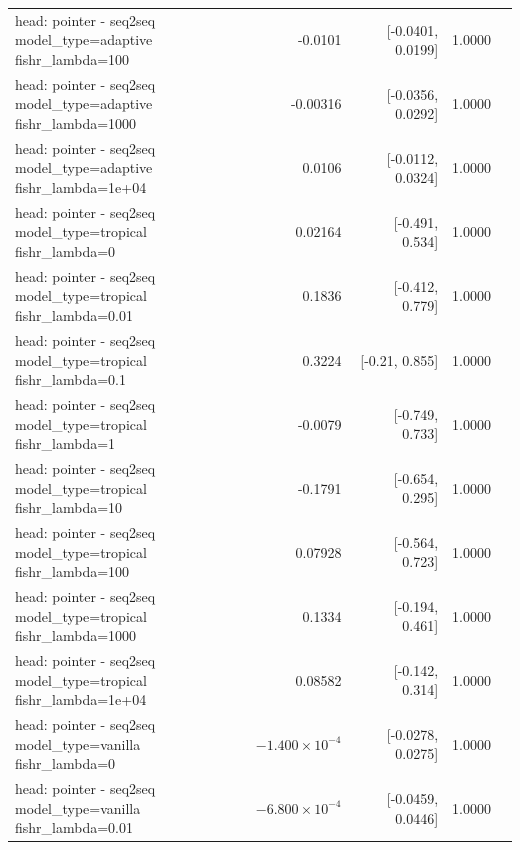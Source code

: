 \documentclass[10pt]{article}
\makeatletter
\newcommand{\stackcell}[1]{\begin{tabular}[t]{@{}l@{}}#1\end{tabular}}
\makeatother
\begin{document}
{\begin{longtable}{lrrrl}
\stackcell{head: pointer - seq2seq\\\footnotesize model\_type=adaptive fishr\_lambda=100 } & -0.0101 & [-0.0401, 0.0199] & 1.0000 & \\
\stackcell{head: pointer - seq2seq\\\footnotesize model\_type=adaptive fishr\_lambda=1000 } & -0.00316 & [-0.0356, 0.0292] & 1.0000 & \\
\stackcell{head: pointer - seq2seq\\\footnotesize model\_type=adaptive fishr\_lambda=1e+04 } & 0.0106 & [-0.0112, 0.0324] & 1.0000 & \\
\stackcell{head: pointer - seq2seq\\\footnotesize model\_type=tropical fishr\_lambda=0 } & 0.02164 & [-0.491, 0.534] & 1.0000 & \\
\stackcell{head: pointer - seq2seq\\\footnotesize model\_type=tropical fishr\_lambda=0.01 } & 0.1836 & [-0.412, 0.779] & 1.0000 & \\
\stackcell{head: pointer - seq2seq\\\footnotesize model\_type=tropical fishr\_lambda=0.1 } & 0.3224 & [-0.21, 0.855] & 1.0000 & \\
\stackcell{head: pointer - seq2seq\\\footnotesize model\_type=tropical fishr\_lambda=1 } & -0.0079 & [-0.749, 0.733] & 1.0000 & \\
\stackcell{head: pointer - seq2seq\\\footnotesize model\_type=tropical fishr\_lambda=10 } & -0.1791 & [-0.654, 0.295] & 1.0000 & \\
\stackcell{head: pointer - seq2seq\\\footnotesize model\_type=tropical fishr\_lambda=100 } & 0.07928 & [-0.564, 0.723] & 1.0000 & \\
\stackcell{head: pointer - seq2seq\\\footnotesize model\_type=tropical fishr\_lambda=1000 } & 0.1334 & [-0.194, 0.461] & 1.0000 & \\
\stackcell{head: pointer - seq2seq\\\footnotesize model\_type=tropical fishr\_lambda=1e+04 } & 0.08582 & [-0.142, 0.314] & 1.0000 & \\
\stackcell{head: pointer - seq2seq\\\footnotesize model\_type=vanilla fishr\_lambda=0 } & $-1.400\times10^{-4}$ & [-0.0278, 0.0275] & 1.0000 & \\
\stackcell{head: pointer - seq2seq\\\footnotesize model\_type=vanilla fishr\_lambda=0.01 } & $-6.800\times10^{-4}$ & [-0.0459, 0.0446] & 1.0000 & \\

\end{longtable}}
\end{document}
